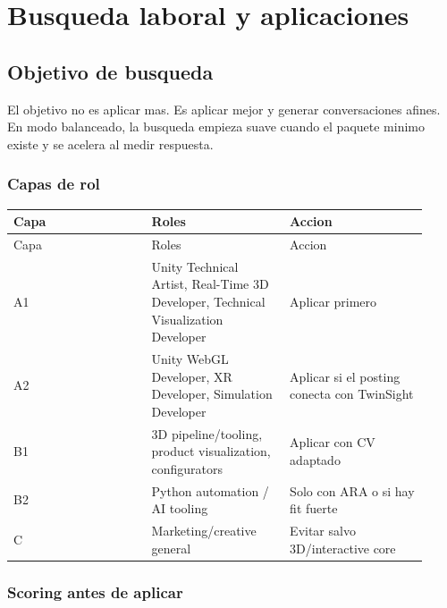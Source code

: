 \chapter{Busqueda laboral y aplicaciones}

\section{Objetivo de busqueda}


El objetivo no es aplicar mas. Es aplicar mejor y generar conversaciones afines. En modo balanceado, la busqueda empieza suave cuando el paquete minimo existe y se acelera al medir respuesta.


\subsection{Capas de rol}


\begin{center}
\scriptsize
\begin{longtable}{>{\raggedright\arraybackslash}p{0.305\linewidth} >{\raggedright\arraybackslash}p{0.305\linewidth} >{\raggedright\arraybackslash}p{0.305\linewidth}}
\toprule
Capa & Roles & Accion \\
\midrule
\endfirsthead
\toprule
Capa & Roles & Accion \\
\midrule
\endhead
A1 & Unity Technical Artist, Real-Time 3D Developer, Technical Visualization Developer & Aplicar primero \\
A2 & Unity WebGL Developer, XR Developer, Simulation Developer & Aplicar si el posting conecta con TwinSight \\
B1 & 3D pipeline/tooling, product visualization, configurators & Aplicar con CV adaptado \\
B2 & Python automation / AI tooling & Solo con ARA o si hay fit fuerte \\
C & Marketing/creative general & Evitar salvo 3D/interactive core \\
\bottomrule
\end{longtable}
\end{center}



\subsection{Scoring antes de aplicar}


